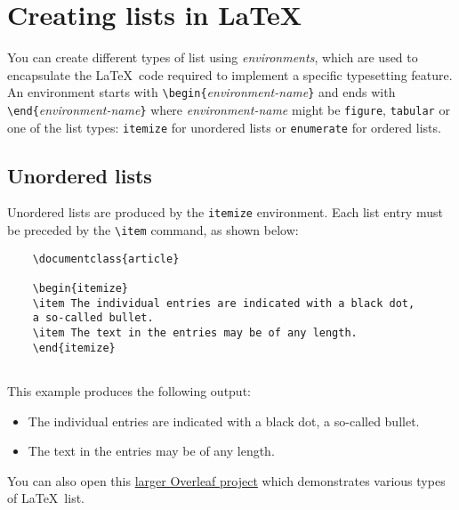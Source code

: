 \section{Creating lists in \LaTeX}

You can create different types of list using \emph{environments}, which are used to encapsulate the \LaTeX\ code required to implement a specific typesetting feature. An environment starts with \verb|\begin{|\emph{environment-name}\verb|}| and ends with \verb|\end{|\emph{environment-name}\verb|}| where \emph{environment-name} might be \verb|figure|, \verb|tabular| or one of the list types: \verb|itemize| for unordered lists or \verb|enumerate| for ordered lists.

\subsection{Unordered lists}

Unordered lists are produced by the \verb|itemize| environment. Each list entry must be preceded by the \verb|\item| command, as shown below:

\begin{tcolorbox}
\begin{verbatim}
    \documentclass{article}
    
    \begin{itemize}
    \item The individual entries are indicated with a black dot, 
    a so-called bullet.
    \item The text in the entries may be of any length.
    \end{itemize}
    
\end{verbatim}
\end{tcolorbox}

This example produces the following output:

\begin{mdframed}
    \begin{itemize}
    \item The individual entries are indicated with a black dot, 
    a so-called bullet.
    \item The text in the entries may be of any length.
    \end{itemize}
\end{mdframed}

You can also open this \href{https://www.overleaf.com/project/new/template/25521?id=107987258&templateName=Demonstrating+various+types+of+LaTeX+list&latexEngine=pdflatex&texImage=texlive-full%3A2022.1&mainFile=}{larger Overleaf project} which demonstrates various types of \LaTeX\ list.

